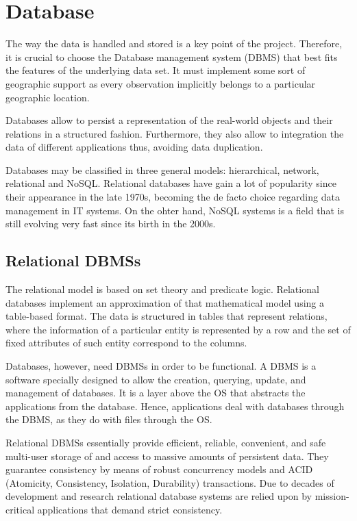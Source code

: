 \section{Database}

The way the data is handled and stored is a key point of the project. Therefore, it is crucial to choose the Database management system (DBMS) that best fits the features of the underlying data set. It must implement some sort of geographic support as every observation implicitly belongs to a particular geographic location.

Databases allow to persist a representation of the real-world objects and their relations in a structured fashion. Furthermore, they also allow to integration the data of different applications thus, avoiding data duplication.

Databases may be classified in three general models: hierarchical, network, relational and NoSQL. Relational databases have gain a lot of popularity since their appearance in the late 1970s, becoming the de facto choice regarding data management in IT systems. On the ohter hand, NoSQL systems is a field that is still evolving very fast since its birth in the 2000s.

\subsection{Relational DBMSs}

The relational model is based on set theory and predicate logic. Relational databases implement an approximation of that mathematical model using a table-based format. The data is structured in tables that represent relations, where the information of a particular entity is represented by a row and the set of fixed attributes of such entity correspond to the columns.

Databases, however, need DBMSs in order to be functional. A DBMS is a software specially designed to allow the creation, querying, update, and management of databases. It is a layer above the OS that abstracts the applications from the database. Hence, applications deal with databases through the DBMS, as they do with files through the OS.

Relational DBMSs essentially provide efficient, reliable, convenient, and safe multi-user storage of and access to massive amounts of persistent data. They guarantee consistency by means of robust concurrency models and ACID (Atomicity, Consistency, Isolation, Durability) transactions. Due to decades of development and research relational database systems are relied upon by mission-critical applications that demand strict consistency.

